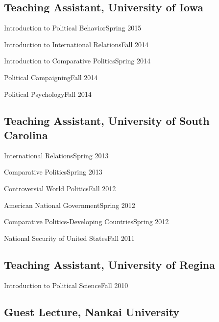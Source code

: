 \documentclass[10.5pt,]{article}
\providecommand{\tightlist}{%
	\setlength{\itemsep}{0pt}\setlength{\parskip}{0pt}}
\renewenvironment{itemize}{
	\begin{list}{}{
			\setlength{\leftmargin}{1.5em}
		}
	}{
	\end{list}
}
\begin{document}
\subsection{Teaching Assistant, University of
Iowa}\label{teaching-assistant-university-of-iowa}

\begin{itemize}
\tightlist
\item
  Introduction to Political Behavior\hfill Spring 2015
\item
  Introduction to International Relations\hfill Fall 2014
\item
  Introduction to Comparative Politics\hfill Spring 2014
\item
  Political Campaigning\hfill Fall 2014
\item
  Political Psychology\hfill Fall 2014
\end{itemize}

\subsection{Teaching Assistant, University of South
Carolina}\label{teaching-assistant-university-of-south-carolina}

\begin{itemize}
\tightlist
\item
  International Relations\hfill Spring 2013
\item
  Comparative Politics\hfill Spring 2013
\item
  Controversial World Politics\hfill Fall 2012
\item
  American National Government\hfill Spring 2012
\item
  Comparative Politics-Developing Countries\hfill Spring 2012
\item
  National Security of United States\hfill Fall 2011
\end{itemize}

\subsection{Teaching Assistant, University of
Regina}\label{teaching-assistant-university-of-regina}

\begin{itemize}
\tightlist
\item
  Introduction to Political Science\hfill Fall 2010
\end{itemize}

\subsection{Guest Lecture, Nankai
University}\label{guest-lecture-nankai-university}
\end{document}
